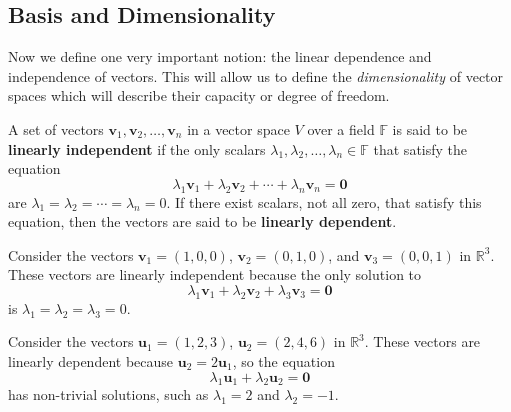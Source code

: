 \documentclass[../../book.tex]{subfiles}
\begin{document}
\subsection{Basis and Dimensionality}

Now we define one very important notion: the linear dependence and independence of vectors.
This will allow us to define the \textit{dimensionality} of vector spaces which will describe their capacity or degree of freedom.

\begin{definition}
    A set of vectors $\mathbf{v}_1, \mathbf{v}_2, \dots, \mathbf{v}_n$ in a vector space $V$ over a field $\mathbb{F}$ is said to be \textbf{linearly independent} if the only scalars $\lambda_1, \lambda_2, \dots, \lambda_n \in \mathbb{F}$ that satisfy the equation
    \begin{equation*}
        \lambda_1 \mathbf{v}_1 + \lambda_2 \mathbf{v}_2 + \cdots + \lambda_n \mathbf{v}_n = \mathbf{0}
    \end{equation*}
    are $\lambda_1 = \lambda_2 = \cdots = \lambda_n = 0$. If there exist scalars, not all zero, that satisfy this equation, then the vectors are said to be \textbf{linearly dependent}.
\end{definition}

\begin{example}
    Consider the vectors $\mathbf{v}_1 = (1, 0, 0)$, $\mathbf{v}_2 = (0, 1, 0)$, and $\mathbf{v}_3 = (0, 0, 1)$ in $\mathbb{R}^3$. These vectors are linearly independent because the only solution to
    \begin{equation*}
        \lambda_1 \mathbf{v}_1 + \lambda_2 \mathbf{v}_2 + \lambda_3 \mathbf{v}_3 = \mathbf{0}
    \end{equation*}
    is $\lambda_1 = \lambda_2 = \lambda_3 = 0$. 
\end{example}

\begin{example}
    Consider the vectors $\mathbf{u}_1 = (1, 2, 3)$, $\mathbf{u}_2 = (2, 4, 6)$ in $\mathbb{R}^3$. These vectors are linearly dependent because $\mathbf{u}_2 = 2\mathbf{u}_1$, so the equation
    \begin{equation*}
        \lambda_1 \mathbf{u}_1 + \lambda_2 \mathbf{u}_2 = \mathbf{0}
    \end{equation*}
    has non-trivial solutions, such as $\lambda_1 = 2$ and $\lambda_2 = -1$.
\end{example}
\end{document}
